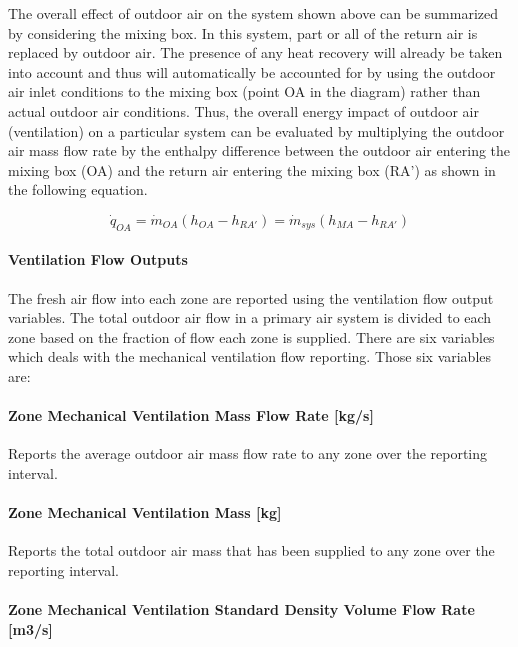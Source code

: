 The overall effect of outdoor air on the system shown above can be summarized by considering the mixing box. In this system, part or all of the return air is replaced by outdoor air. The presence of any heat recovery will already be taken into account and thus will automatically be accounted for by using the outdoor air inlet conditions to the mixing box (point OA in the diagram) rather than actual outdoor air conditions. Thus, the overall energy impact of outdoor air (ventilation) on a particular system can be evaluated by multiplying the outdoor air mass flow rate by the enthalpy difference between the outdoor air entering the mixing box (OA) and the return air entering the mixing box (RA') as shown in the following equation.

\begin{equation}
{\dot q_{OA}} = {\dot m_{OA}}\left( {{h_{OA}} - {h_{RA'}}} \right) = {\dot m_{sys}}\left( {{h_{MA}} - {h_{RA'}}} \right)
\end{equation}

\paragraph{Ventilation Flow Outputs}\label{ventilation-flow-outputs}

The fresh air flow into each zone are reported using the ventilation flow output variables. The total outdoor air flow in a primary air system is divided to each zone based on the fraction of flow each zone is supplied. There are six variables which deals with the mechanical ventilation flow reporting. Those six variables are:

\paragraph{Zone Mechanical Ventilation Mass Flow Rate {[}kg/s{]}}\label{zone-mechanical-ventilation-mass-flow-rate-kgs}

Reports the average outdoor air mass flow rate to any zone over the reporting interval.

\paragraph{Zone Mechanical Ventilation Mass {[}kg{]}}\label{zone-mechanical-ventilation-mass-kg}

Reports the total outdoor air mass that has been supplied to any zone over the reporting interval.

\paragraph{Zone Mechanical Ventilation Standard Density Volume Flow Rate {[}m3/s{]}}\label{zone-mechanical-ventilation-standard-density-volume-flow-rate-m3s}

